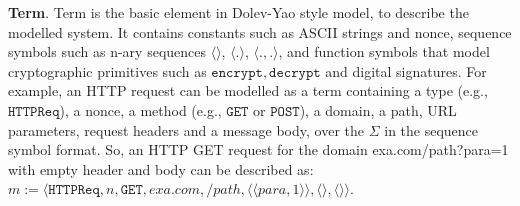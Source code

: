 \vspace{1mm}
\noindent\textbf{Term}. Term is the basic element in Dolev-Yao style model, to describe the modelled system.
It contains constants such as ASCII strings and nonce, sequence symbols such as n-ary sequences $\langle \rangle$, $\langle . \rangle$, $\langle . ,. \rangle$, and function symbols that model cryptographic primitives such as $\mathtt{encrypt}, \mathtt{decrypt}$ and digital signatures.
For example, an HTTP request can be modelled as a term containing a type (e.g., $\mathtt{HTTPReq}$), a nonce, a method (e.g., $\mathtt{GET}$ or $\mathtt{POST}$), a domain, a path, URL parameters, request headers and a message body, over the $\Sigma$ in the sequence symbol format. So,
an HTTP GET request for the domain {\sf exa.com/path?para=1} with empty header and body can be described as: $m:=\langle\mathtt{HTTPReq},n,\mathtt{GET},exa.com,/path,\langle \langle para, 1\rangle \rangle ,\langle \rangle,\langle \rangle \rangle$.

